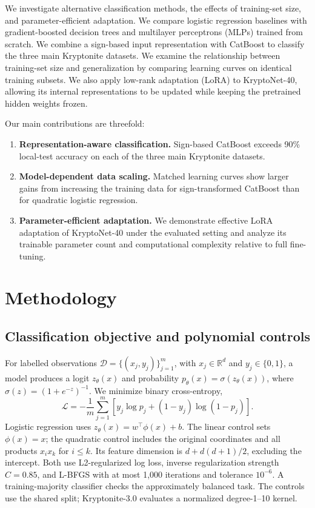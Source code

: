 \documentclass{article}
\begin{document}
We investigate alternative classification methods, the effects of training-set size, and parameter-efficient adaptation. We compare logistic regression baselines with gradient-boosted decision trees and multilayer perceptrons (MLPs) trained from scratch. We combine a sign-based input representation with CatBoost to classify the three main Kryptonite datasets. We examine the relationship between training-set size and generalization by comparing learning curves on identical training subsets. We also apply low-rank adaptation (LoRA) to KryptoNet-40, allowing its internal representations to be updated while keeping the pretrained hidden weights frozen.

Our main contributions are threefold:

\begin{enumerate}
\item \textbf{Representation-aware classification.} Sign-based CatBoost exceeds 90\% local-test accuracy on each of the three main Kryptonite datasets.
\item \textbf{Model-dependent data scaling.} Matched learning curves show larger gains from increasing the training data for sign-transformed CatBoost than for quadratic logistic regression.
\item \textbf{Parameter-efficient adaptation.} We demonstrate effective LoRA adaptation of KryptoNet-40 under the evaluated setting and analyze its trainable parameter count and computational complexity relative to full fine-tuning.
\end{enumerate}

\section{Methodology}
\subsection{Classification objective and polynomial controls}
For labelled observations $\mathcal D=\{(x_j,y_j)\}_{j=1}^m$, with $x_j\in\mathbb R^d$ and $y_j\in\{0,1\}$, a model produces a logit $z_\theta(x)$ and probability $p_\theta(x)=\sigma(z_\theta(x))$, where $\sigma(z)=(1+e^{-z})^{-1}$. We minimize binary cross-entropy,
\begin{equation}
\mathcal L=-\frac1m\sum_{j=1}^m\left[y_j\log p_j+(1-y_j)\log(1-p_j)\right].
\label{eq:bce}
\end{equation}
Logistic regression uses $z_\theta(x)=w^\top\phi(x)+b$. The linear control sets $\phi(x)=x$; the quadratic control includes the original coordinates and all products $x_i x_k$ for $i\leq k$. Its feature dimension is $d+d(d+1)/2$, excluding the intercept. Both use L2-regularized log loss, inverse regularization strength $C=0.85$, and L-BFGS with at most 1,000 iterations and tolerance $10^{-6}$. A training-majority classifier checks the approximately balanced task. The controls use the shared split; Kryptonite-3.0 evaluates a normalized degree-1--10 kernel.
\end{document}
